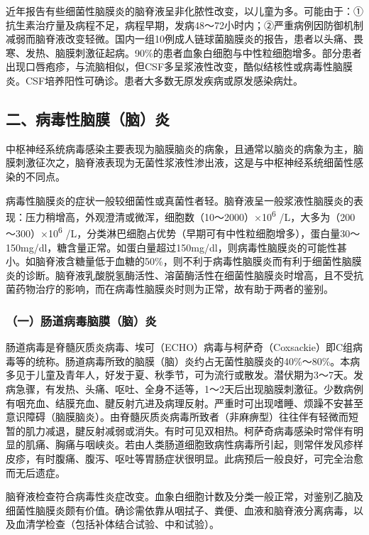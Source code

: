 近年报告有些细菌性脑膜炎的脑脊液呈非化脓性改变，以儿童为多。可能由于：①抗生素治疗量及病程不足，病程早期，发病48～72小时内；②严重病例因防御机制减弱而脑脊液改变轻微。国内一组10例成人链球菌脑膜炎的报告，患者以头痛、畏寒、发热、脑膜刺激征起病。90\%的患者血象白细胞与中性粒细胞增多。部分患者出现口唇疱疹，与流脑相似，但CSF多呈浆液性改变，酷似结核性或病毒性脑膜炎。CSF培养阳性可确诊。患者大多数无原发疾病或原发感染病灶。

\protect\hypertarget{text00385.html}{}{}

\subsection{二、病毒性脑膜（脑）炎}

中枢神经系统病毒感染主要表现为脑膜脑炎的病象，且通常以脑炎的病象为主，脑膜刺激征次之，脑脊液表现为无菌性浆液性渗出液，这是与中枢神经系统细菌性感染的不同点。

病毒性脑膜炎的症状一般较细菌性或真菌性者轻。脑脊液呈一般浆液性脑膜炎的表现：压力稍增高，外观澄清或微浑，细胞数（10～2000）×10\textsuperscript{6}
/L，大多为（200～300）×10\textsuperscript{6}
/L，分类淋巴细胞占优势（早期可有中性粒细胞增多），蛋白量30～150mg/dl，糖含量正常。如蛋白量超过150mg/dl，则病毒性脑膜炎的可能性甚小。如脑脊液含糖量低于血糖的50\%，则不利于病毒性脑膜炎而有利于细菌性脑膜炎的诊断。脑脊液乳酸脱氢酶活性、溶菌酶活性在细菌性脑膜炎时增高，且不受抗菌药物治疗的影响，而在病毒性脑膜炎时则为正常，故有助于两者的鉴别。

\subsubsection{（一）肠道病毒脑膜（脑）炎}

肠道病毒是脊髓灰质炎病毒、埃可（ECHO）病毒与柯萨奇（Coxsackie）即C组病毒等的统称。肠道病毒所致的脑膜（脑）炎约占无菌性脑膜炎的40\%～80\%。本病多见于儿童及青年人，好发于夏、秋季节，可为流行或散发。潜伏期为3～7天。发病急骤，有发热、头痛、呕吐、全身不适等，1～2天后出现脑膜刺激征。少数病例有咽充血、结膜充血、腱反射亢进及病理反射。严重时可出现嗜睡、烦躁不安甚至意识障碍（脑膜脑炎）。由脊髓灰质炎病毒所致者（非麻痹型）往往伴有轻微而短暂的肌力减退，腱反射减弱或消失。有时可见双相热。柯萨奇病毒感染时常伴有明显的肌痛、胸痛与咽峡炎。若由人类肠道细胞致病性病毒所引起，则常伴发风疹样皮疹，有时腹痛、腹泻、呕吐等胃肠症状很明显。此病预后一般良好，可完全治愈而无后遗症。

脑脊液检查符合病毒性炎症改变。血象白细胞计数及分类一般正常，对鉴别乙脑及细菌性脑膜炎颇有价值。确诊需依靠从咽拭子、粪便、血液和脑脊液分离病毒，以及血清学检查（包括补体结合试验、中和试验）。

